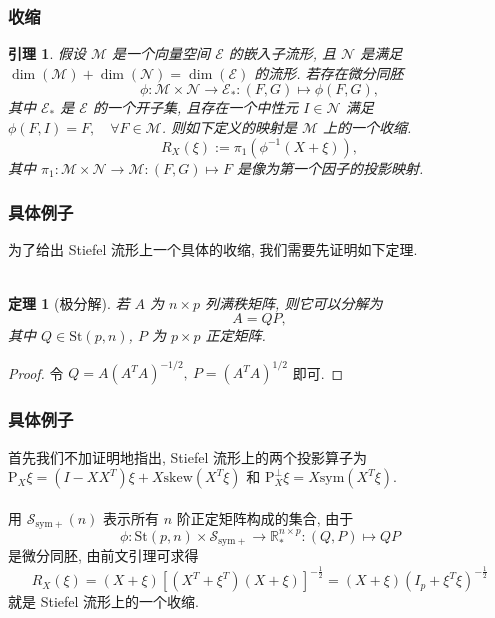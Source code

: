 \documentclass[notheorems,envcountsect,UTF8,pdfpagemode=FullScreen]{ctexbeamer}
\theoremstyle{plain}
\newtheorem{theorem}{定理}
\newtheorem{lemma}{引理}
\theoremstyle{definition}
\theoremstyle{example}
\begin{document}
\begin{frame}
\frametitle{收缩}
\begin{lemma}
假设 $\mathcal{M}$ 是一个向量空间 $\mathcal{E}$ 的嵌入子流形, 且 $\mathcal{N}$ 是满足 $\dim(\mathcal{M})+\dim(\mathcal{N})=\dim(\mathcal{E})$ 的流形. 若存在微分同胚
$$\phi:\mathcal{M}\times\mathcal{N}\to\mathcal{E}_*:(F,G)\mapsto\phi(F,G),$$
其中 $\mathcal{E}_*$ 是 $\mathcal{E}$ 的一个开子集, 且存在一个中性元 $I\in\mathcal{N}$ 满足 $\phi(F,I)=F,\quad\forall F\in\mathcal{M}$.
则如下定义的映射是 $\mathcal{M}$ 上的一个收缩.
$$R_X(\xi):=\pi_1(\phi^{-1}(X+\xi)),$$
其中 $\pi_1:\mathcal{M}\times\mathcal{N}\to\mathcal{M}:(F,G)\mapsto F$ 是像为第一个因子的投影映射. 
\end{lemma}
\end{frame}

\begin{frame}
\frametitle{具体例子}
\qquad 为了给出 Stiefel 流形上一个具体的收缩, 我们需要先证明如下定理.
\\~\\
\begin{theorem}[极分解]
若 $A$ 为 $n\times p$ 列满秩矩阵, 则它可以分解为
$$A=QP,$$
其中 $Q\in\mathrm{St}(p,n)$, $P$ 为 $p\times p$ 正定矩阵.
\end{theorem}
\begin{proof}
令 $Q=A(A^TA)^{-1/2},\ P=(A^TA)^{1/2}$ 即可.
\end{proof}
\end{frame}

\begin{frame}
\frametitle{具体例子}
\qquad 首先我们不加证明地指出, Stiefel 流形上的两个投影算子为
$\mathrm{P}_X\xi=(I-XX^T)\xi+X\mathrm{skew}(X^T\xi)$ 和 $\mathrm{P}_X^\bot\xi=X\mathrm{sym}(X^T\xi).$
\\~\\
\qquad 用 $\mathcal{S}_{\mathrm{sym}+}(n)$ 表示所有 $n$ 阶正定矩阵构成的集合, 由于
$$\phi:\mathrm{St}(p,n)\times\mathcal{S}_{\mathrm{sym}+}\to\mathbb{R}^{n\times p}_*:(Q,P)\mapsto QP$$
是微分同胚, 由前文引理可求得
$$R_X(\xi)=(X+\xi)[(X^T+\xi^T)(X+\xi)]^{-\frac{1}{2}}=(X+\xi)(I_p+\xi^T\xi)^{-\frac{1}{2}}$$
就是 Stiefel 流形上的一个收缩.
\end{frame}
\end{document}
